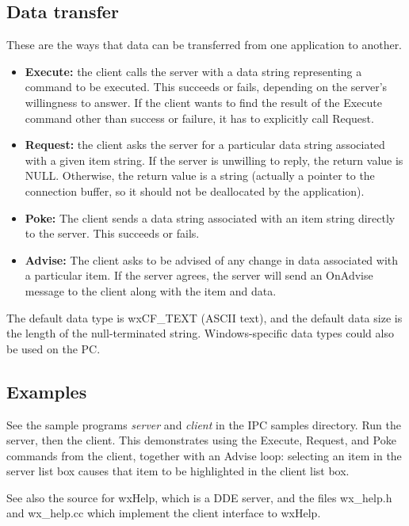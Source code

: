 \subsection{Data transfer}

These are the ways that data can be transferred from one application to
another.

\begin{itemize}\itemsep=0pt
\item {\bf Execute:} the client calls the server with a data string representing
a command to be executed. This succeeds or fails, depending on the
server's willingness to answer. If the client wants to find the result
of the Execute command other than success or failure, it has to explicitly
call Request.
\item {\bf Request:} the client asks the server for a particular data string
associated with a given item string. If the server is unwilling to
reply, the return value is NULL. Otherwise, the return value is a string
(actually a pointer to the connection buffer, so it should not be
deallocated by the application).
\item {\bf Poke:} The client sends a data string associated with an item
string directly to the server. This succeeds or fails.
\item {\bf Advise:} The client asks to be advised of any change in data
associated with a particular item. If the server agrees, the server will
send an OnAdvise message to the client along with the item and data.
\end{itemize}

The default data type is wxCF\_TEXT (ASCII text), and the default data
size is the length of the null-terminated string. Windows-specific data
types could also be used on the PC.

\subsection{Examples}

See the sample programs {\it server}\/ and {\it client}\/ in the IPC
samples directory.  Run the server, then the client. This demonstrates
using the Execute, Request, and Poke commands from the client, together
with an Advise loop: selecting an item in the server list box causes
that item to be highlighted in the client list box.

See also the source for wxHelp, which is a DDE server, and the files
wx\_help.h and wx\_help.cc which implement the client interface to
wxHelp.

